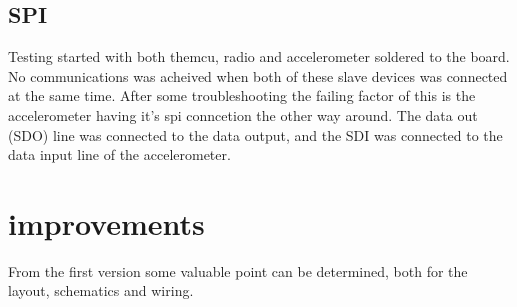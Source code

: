 \subsection{SPI}
Testing started with both the\gls{mcu}, radio and accelerometer soldered to the board. No communications was acheived when both of these slave devices was connected at the same time. After some troubleshooting the failing factor of this is the accelerometer having it's \gls{spi} conncetion the other way around. The data out (SDO) line was connected to the data output, and the SDI was connected to the data input line of the accelerometer.  


\section{improvements}
From the first version some valuable point can be determined, both for the layout, schematics and wiring.

